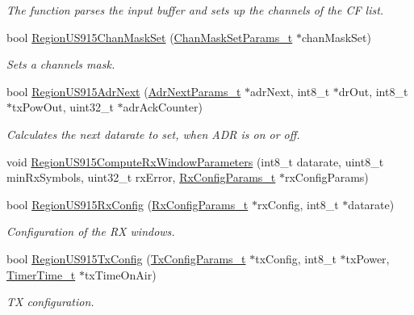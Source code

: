\begin{DoxyCompactItemize}
\begin{DoxyCompactList}\small\item\em The function parses the input buffer and sets up the channels of the CF list. \end{DoxyCompactList}\item 
bool \hyperlink{group__REGIONUS915_ga9f5d2b3a3e5832ad822ac7f59abd3130}{Region\+U\+S915\+Chan\+Mask\+Set} (\hyperlink{group__REGION_ga6d24f7da136006410827dfb29f6b9b9e}{Chan\+Mask\+Set\+Params\+\_\+t} $\ast$chan\+Mask\+Set)
\begin{DoxyCompactList}\small\item\em Sets a channels mask. \end{DoxyCompactList}\item 
bool \hyperlink{group__REGIONUS915_gaf76316af68c44cbbc44818e0a51cb4d6}{Region\+U\+S915\+Adr\+Next} (\hyperlink{group__REGION_ga567c2742622326b350b4e91bbf61b4ce}{Adr\+Next\+Params\+\_\+t} $\ast$adr\+Next, int8\+\_\+t $\ast$dr\+Out, int8\+\_\+t $\ast$tx\+Pow\+Out, uint32\+\_\+t $\ast$adr\+Ack\+Counter)
\begin{DoxyCompactList}\small\item\em Calculates the next datarate to set, when A\+DR is on or off. \end{DoxyCompactList}\item 
void \hyperlink{group__REGIONUS915_gad480c9c758da7477276d2dc659db2f66}{Region\+U\+S915\+Compute\+Rx\+Window\+Parameters} (int8\+\_\+t datarate, uint8\+\_\+t min\+Rx\+Symbols, uint32\+\_\+t rx\+Error, \hyperlink{group__REGION_ga375c038078dfcfc7ef14280021db719e}{Rx\+Config\+Params\+\_\+t} $\ast$rx\+Config\+Params)
\item 
bool \hyperlink{group__REGIONUS915_ga714ceef0507bb8bd0a65c5b2de8eff2c}{Region\+U\+S915\+Rx\+Config} (\hyperlink{group__REGION_ga375c038078dfcfc7ef14280021db719e}{Rx\+Config\+Params\+\_\+t} $\ast$rx\+Config, int8\+\_\+t $\ast$datarate)
\begin{DoxyCompactList}\small\item\em Configuration of the RX windows. \end{DoxyCompactList}\item 
bool \hyperlink{group__REGIONUS915_ga6343e63ddd0e281369b5741319fecc58}{Region\+U\+S915\+Tx\+Config} (\hyperlink{group__REGION_gabed730d4d04b0b60d4b6d1966d3f21d3}{Tx\+Config\+Params\+\_\+t} $\ast$tx\+Config, int8\+\_\+t $\ast$tx\+Power, \hyperlink{utilities_8h_a4215ca43d3e953099ea758ce428599d0}{Timer\+Time\+\_\+t} $\ast$tx\+Time\+On\+Air)
\begin{DoxyCompactList}\small\item\em TX configuration. \end{DoxyCompactList}\item 

\end{DoxyCompactItemize}
